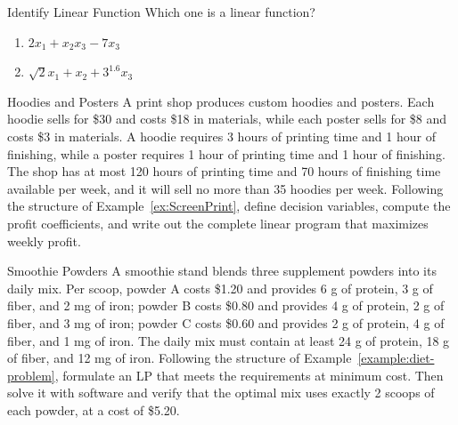 \begin{ex}{Identify Linear Function}{}
 Which one is a linear function?

\begin{enumerate}
    \item $2x_1 + x_2x_3 - 7x_3$
    \item $\sqrt{2}x_1 + x_2 + 3^{1.6}x_3$
\end{enumerate}
\end{ex}

\begin{ex}{Hoodies and Posters}{}
\label{ex:HoodiePosters}
 A print shop produces custom hoodies and posters. Each hoodie sells for \$30 and costs \$18 in materials, while each poster sells for \$8 and costs \$3 in materials. A hoodie requires 3 hours of printing time and 1 hour of finishing, while a poster requires 1 hour of printing time and 1 hour of finishing. The shop has at most 120 hours of printing time and 70 hours of finishing time available per week, and it will sell no more than 35 hoodies per week. Following the structure of Example~\ref{ex:ScreenPrint}, define decision variables, compute the profit coefficients, and write out the complete linear program that maximizes weekly profit.
\end{ex}

\begin{ex}{Smoothie Powders}{}
 A smoothie stand blends three supplement powders into its daily mix. Per scoop, powder A costs \$1.20 and provides 6 g of protein, 3 g of fiber, and 2 mg of iron; powder B costs \$0.80 and provides 4 g of protein, 2 g of fiber, and 3 mg of iron; powder C costs \$0.60 and provides 2 g of protein, 4 g of fiber, and 1 mg of iron. The daily mix must contain at least 24 g of protein, 18 g of fiber, and 12 mg of iron. Following the structure of Example~\ref{example:diet-problem}, formulate an LP that meets the requirements at minimum cost. Then solve it with software and verify that the optimal mix uses exactly 2 scoops of each powder, at a cost of \$5.20.
\end{ex}


